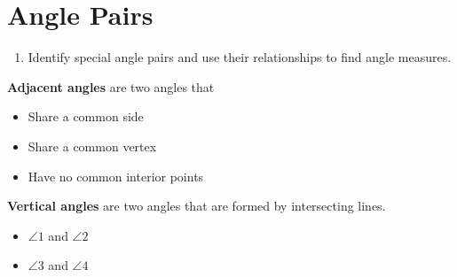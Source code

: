 \documentclass{article}
\begin{document}
\section*{Angle Pairs}

\begin{tcolorbox}[colframe=orange!70!white, coltitle=black, title=\textbf{Today I Can}]
\begin{enumerate}
    \item Identify special angle pairs and use their relationships to find angle measures.
\end{enumerate}
\end{tcolorbox}

\begin{tcolorbox}[colframe=black!20!white, opacitybacktitle=0.1, coltitle=black, title=\textbf{Adjacent Angles}]
\textbf{Adjacent angles} are two angles that \newline 

\begin{minipage}{0.5\textwidth}
\begin{itemize}
    \item Share a common side
    \item Share a common vertex
    \item Have no common interior points
\end{itemize}
\end{minipage}
\begin{minipage}{0.3\textwidth}
\end{minipage}
\end{tcolorbox}

\begin{tcolorbox}[colframe=black!20!white, opacitybacktitle=0.1, coltitle=black, title=\textbf{Vertical Angles}]
\textbf{Vertical angles} are two angles that are formed by intersecting lines. \newline 

\begin{minipage}{0.3\textwidth}
    \begin{itemize}
        \item $\angle 1$ and $\angle 2$
        \item $\angle 3$ and $\angle 4$
    \end{itemize}
\end{minipage}
\begin{minipage}{0.3\textwidth}
\end{minipage}
\end{tcolorbox}
\end{document}
